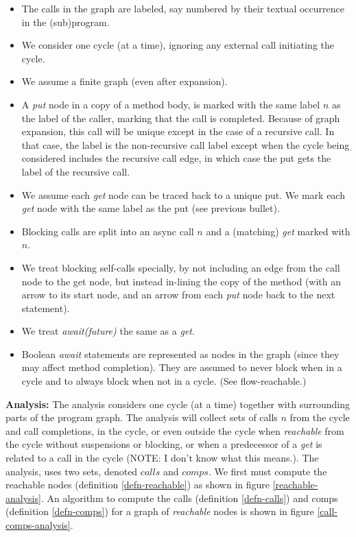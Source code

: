 \documentclass[12pt]{article}%
\begin{document}
\begin{itemize}
\item
The calls in the graph are labeled, 
say numbered by their textual occurrence in the (sub)program.
\item
 We consider one cycle (at a time),
ignoring any external call initiating the cycle.
\item
We assume a finite graph (even after expansion).
\item 
A \emph{put} node in a copy of a method body, is marked with the same label $n$ as the label of the
caller, marking that the call is completed. Because of graph expansion, this call will be unique except
in the case of a recursive call. In that case, the label is the non-recursive call label except when
the cycle being considered includes the recursive call edge, in which case the put gets the label of the recursive call.
\item
We assume each \emph{get}  node can be traced back to a unique put. 
We mark each \emph{get} node with the same label as the put (see previous bullet).
\item
Blocking calls are split into an async call $n$ and a (matching) \emph{get}
marked with  $n$.
\item
We treat blocking self-calls specially,
by not including an edge from the call node to the get node,
but instead  in-lining  the copy of the method
 (with an arrow to its
start node, and an arrow from each  \emph{put} node
back to the next statement).
\item We treat \emph{await(future)} the same as a \emph{get}.
\item
Boolean \emph{await} statements are represented as nodes in the graph
(since they may affect method completion). They are assumed to never block when in a cycle and to
always block when not in a cycle. (See flow-reachable.)

\end{itemize}
\textbf{Analysis:}
The analysis considers one cycle (at a time)
together with surrounding parts of the program graph.
The analysis will collect sets of calls $n$ from the cycle and call completions,
in  the cycle, or even outside  the cycle when \emph{reachable} from the cycle without suspensions or blocking,
or  when a predecessor of  a \emph{get} is related to a call in the cycle (NOTE: I don't know what this means.).
The analysis, uses two sets, denoted $calls$ and $comps$. We first must compute the reachable nodes (definition \ref{defn-reachable})
as shown in figure \ref{reachable-analysis}.
An algorithm to compute the calls (definition \ref{defn-calls}) and comps (definition \ref{defn-comps}) 
for a graph of \emph{reachable} nodes is shown in figure \ref{call-comps-analysis}.
\end{document}
